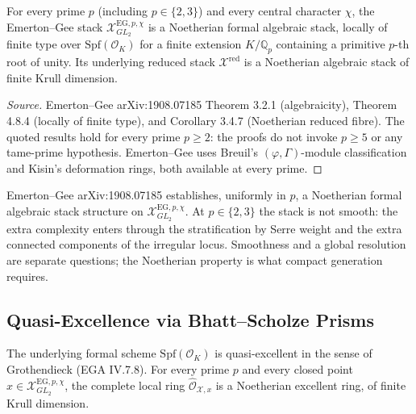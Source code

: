 \begin{proposition}
\label{v4-arith:w5-g:f1a3-C:prop:EG-noetherian}
For every prime \(p\) (including
\(p\in\{2,3\}\)) and every central character \(\chi\), the
Emerton--Gee stack \(\mathcal{X}^{\mathrm{EG},p,\chi}_{GL_{2}}\) is a
Noetherian formal algebraic stack, locally of finite type over
\(\mathrm{Spf}(\mathcal{O}_{K})\) for a finite extension \(K/\mathbb{Q}_{p}\)
containing a primitive \(p\)-th root of unity. Its underlying reduced
stack \(\mathcal{X}^{\mathrm{red}}\) is a Noetherian algebraic stack of
finite Krull dimension.
\end{proposition}

\begin{proof}[Source]
Emerton--Gee arXiv:1908.07185 Theorem 3.2.1 (algebraicity),
Theorem 4.8.4 (locally of finite type), and Corollary 3.4.7
(Noetherian reduced fibre). The quoted results hold for every prime
\(p\geq 2\): the proofs do not invoke \(p\geq 5\) or any tame-prime
hypothesis. Emerton--Gee uses Breuil's \((\varphi,\Gamma)\)-module
classification and Kisin's deformation rings, both available at every
prime.
\end{proof}

\begin{remark}
\label{v4-arith:w5-g:f1a3-C:rem:EG-output-wild}
Emerton--Gee arXiv:1908.07185 establishes, uniformly in \(p\), a Noetherian
formal algebraic stack structure on \(\mathcal{X}^{\mathrm{EG},p,\chi}_{GL_{2}}\).
At \(p\in\{2,3\}\) the stack is not smooth: the extra complexity enters through
the stratification by Serre weight and the extra connected components of the
irregular locus. Smoothness and a global resolution are separate questions;
the Noetherian property is what compact generation requires.
\end{remark}

\subsection{Quasi-Excellence via Bhatt--Scholze Prisms}

\begin{proposition}
\label{v4-arith:w5-g:f1a3-C:prop:quasi-excellent}
The underlying formal scheme
\(\mathrm{Spf}(\mathcal{O}_{K})\) is quasi-excellent in the sense of
Grothendieck (EGA IV.7.8). For every prime \(p\) and every closed point
\(x\in\mathcal{X}^{\mathrm{EG},p,\chi}_{GL_{2}}\), the complete local
ring \(\widehat{\mathcal{O}}_{\mathcal{X},x}\) is a Noetherian excellent
ring, of finite Krull dimension.
\end{proposition}


